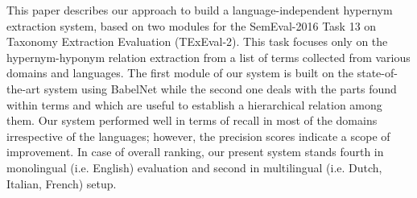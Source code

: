 This paper describes our approach to build a language-independent hypernym extraction system, based on two modules for the SemEval-2016 Task 13 on Taxonomy Extraction Evaluation (TExEval-2). This task focuses only on the hypernym-hyponym relation extraction from a list of terms collected from various domains and languages. The first module of our system is built on the state-of-the-art system using BabelNet while the second one deals with the parts found within terms and which are useful to establish a hierarchical relation among them. Our system performed well in terms of recall in most of the domains irrespective of the languages; however, the precision scores indicate a scope of improvement. In case of overall ranking, our present system stands fourth in monolingual (i.e. English) evaluation and second in multilingual (i.e. Dutch, Italian, French) setup.
